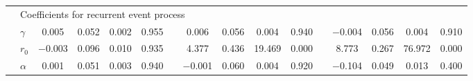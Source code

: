 \begin{table}[H]
{\begin{tabular}{clcccccccccccccc}
  &  \multicolumn{12}{l}{Coefficients for recurrent event process}\\
  & $\gamma$ & 0.005 & 0.052 & 0.002 & 0.955 && 0.006 & 0.056 & 0.004 & 0.940 && $-$0.004 & 0.056 & 0.004 & 0.910\\
  & $r_0$ & $-$0.003 & 0.096 & 0.010 & 0.935 && 4.377 & 0.436 & 19.469 & 0.000 && 8.773 & 0.267 & 76.972 & 0.000\\
  & $\alpha$ & 0.001 & 0.051 & 0.003 & 0.940 && $-$0.001 & 0.060 & 0.004 & 0.920 && $-$0.104 & 0.049 & 0.013 & 0.400\\
   \hline
\end{tabular}
}
\end{table}






\newpage
